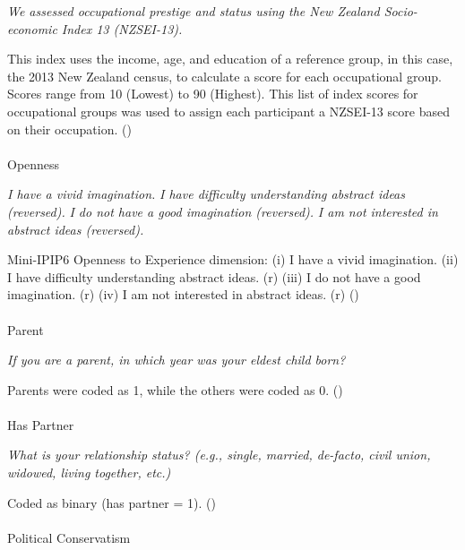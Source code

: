\documentclass[
  single column]{article}
\makeatletter
\let\oldparagraph\paragraph
\renewcommand{\paragraph}{
    \@ifstar
      \xxxParagraphStar
      \xxxParagraphNoStar
  }
\newcommand{\xxxParagraphStar}[1]{\oldparagraph*{#1}\mbox{}}
\newcommand{\xxxParagraphNoStar}[1]{\oldparagraph{#1}\mbox{}}
\makeatother
\begin{document}
\emph{We assessed occupational prestige and status using the New Zealand
Socio-economic Index 13 (NZSEI-13).}

This index uses the income, age, and education of a reference group, in
this case, the 2013 New Zealand census, to calculate a score for each
occupational group. Scores range from 10 (Lowest) to 90 (Highest). This
list of index scores for occupational groups was used to assign each
participant a NZSEI-13 score based on their occupation.
()

\paragraph{Openness}\label{openness}

\emph{I have a vivid imagination.} \emph{I have difficulty understanding
abstract ideas (reversed).} \emph{I do not have a good imagination
(reversed).} \emph{I am not interested in abstract ideas (reversed).}

Mini-IPIP6 Openness to Experience dimension: (i) I have a vivid
imagination. (ii) I have difficulty understanding abstract ideas. (r)
(iii) I do not have a good imagination. (r) (iv) I am not interested in
abstract ideas. (r) ()

\paragraph{Parent}\label{parent}

\emph{If you are a parent, in which year was your eldest child born?}

Parents were coded as 1, while the others were coded as 0.
()

\paragraph{Has Partner}\label{has-partner}

\emph{What is your relationship status? (e.g., single, married,
de-facto, civil union, widowed, living together, etc.)}

Coded as binary (has partner = 1). ()

\paragraph{Political Conservatism}\label{political-conservatism}
\end{document}
